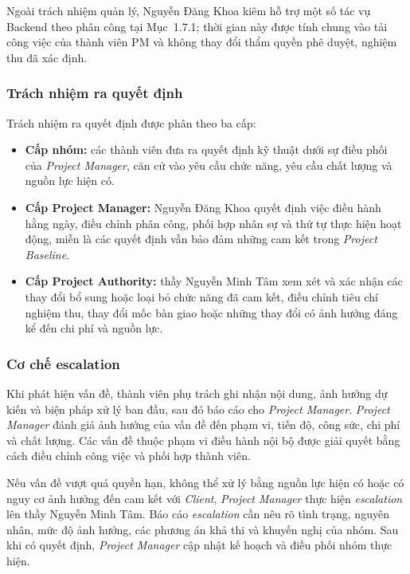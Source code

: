 Ngoài trách nhiệm quản lý, Nguyễn Đăng Khoa kiêm hỗ trợ một số tác vụ Backend theo phân công tại Mục~1.7.1; thời gian này được tính chung vào tải công việc của thành viên PM và không thay đổi thẩm quyền phê duyệt, nghiệm thu đã xác định.

\subsubsection{Trách nhiệm ra quyết định}

Trách nhiệm ra quyết định được phân theo ba cấp:

\begin{itemize}
    \item \textbf{Cấp nhóm:} các thành viên đưa ra quyết định kỹ thuật dưới sự điều phối của \textit{Project Manager}, căn cứ vào yêu cầu chức năng, yêu cầu chất lượng và nguồn lực hiện có.

    \item \textbf{Cấp Project Manager:} Nguyễn Đăng Khoa quyết định việc điều hành hằng ngày, điều chỉnh phân công, phối hợp nhân sự và thứ tự thực hiện hoạt động, miễn là các quyết định vẫn bảo đảm những cam kết trong \textit{Project Baseline}.

    \item \textbf{Cấp Project Authority:} thầy Nguyễn Minh Tâm xem xét và xác nhận các thay đổi bổ sung hoặc loại bỏ chức năng đã cam kết, điều chỉnh tiêu chí nghiệm thu, thay đổi mốc bàn giao hoặc những thay đổi có ảnh hưởng đáng kể đến chi phí và nguồn lực.
\end{itemize}

\subsubsection{Cơ chế escalation}

Khi phát hiện vấn đề, thành viên phụ trách ghi nhận nội dung, ảnh hưởng dự kiến và biện pháp xử lý ban đầu, sau đó báo cáo cho \textit{Project Manager}. \textit{Project Manager} đánh giá ảnh hưởng của vấn đề đến phạm vi, tiến độ, công sức, chi phí và chất lượng. Các vấn đề thuộc phạm vi điều hành nội bộ được giải quyết bằng cách điều chỉnh công việc và phối hợp thành viên.

Nếu vấn đề vượt quá quyền hạn, không thể xử lý bằng nguồn lực hiện có hoặc có nguy cơ ảnh hưởng đến cam kết với \textit{Client}, \textit{Project Manager} thực hiện \textit{escalation} lên thầy Nguyễn Minh Tâm. Báo cáo \textit{escalation} cần nêu rõ tình trạng, nguyên nhân, mức độ ảnh hưởng, các phương án khả thi và khuyến nghị của nhóm. Sau khi có quyết định, \textit{Project Manager} cập nhật kế hoạch và điều phối nhóm thực hiện.


